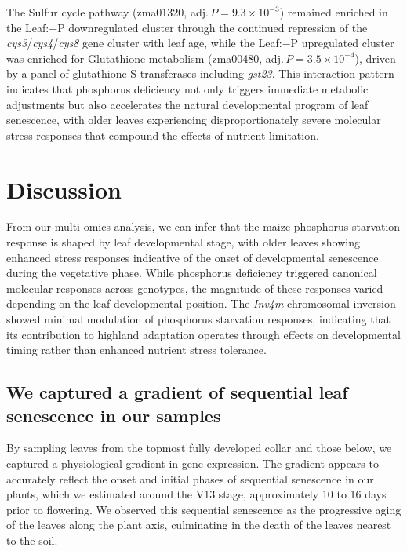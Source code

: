 \documentclass[9pt,twocolumn,twoside]{rilabRxiv}
\newcommand{\invfour}{\textit{Inv4m}\xspace}
\begin{document}
The Sulfur cycle pathway (zma01320, adj.\,$P = 9.3\times 10^{-3}$) remained enriched in the Leaf:$-$P downregulated cluster through the continued repression of the \textit{cys3}/\textit{cys4}/\textit{cys8} gene cluster with leaf age, while the Leaf:$-$P upregulated cluster was enriched for Glutathione metabolism (zma00480, adj.\,$P = 3.5\times 10^{-4}$), driven by a panel of glutathione S-transferases including \textit{gst23}.
This interaction pattern indicates that phosphorus deficiency not only triggers immediate metabolic adjustments but also accelerates the natural developmental program of leaf senescence, with older leaves experiencing disproportionately severe molecular stress responses that compound the effects of nutrient limitation.

\section{Discussion}

From our multi-omics analysis, we can infer that the maize phosphorus starvation response is shaped by leaf developmental stage, with older leaves showing enhanced stress responses indicative of the onset of developmental senescence during the vegetative phase.
While phosphorus deficiency triggered canonical molecular responses across genotypes, the magnitude of these responses varied depending on the leaf developmental position.
The \invfour chromosomal inversion showed minimal modulation of phosphorus starvation responses, indicating that its contribution to highland adaptation operates through effects on developmental timing rather than enhanced nutrient stress tolerance.

\subsection*{We captured a gradient of sequential leaf senescence in our samples}

By sampling leaves from the topmost fully developed collar and those below, we captured a physiological gradient in gene expression. 
The gradient appears to accurately reflect the onset and initial phases of sequential senescence in our plants, which we estimated around the V13 stage, approximately 10 to 16 days prior to flowering. 
We observed this sequential senescence as the progressive aging of the leaves along the plant axis, culminating in the death of the leaves nearest to the soil.
\end{document}
